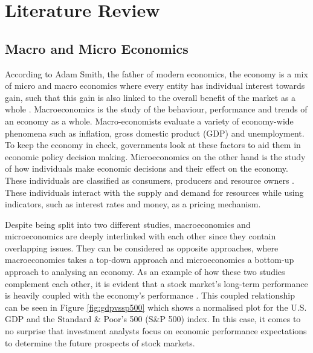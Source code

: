 \documentclass{UoYCSproject}
\begin{document}
\chapter{Literature Review}
\label{cha:literaturereview}

\section{Macro and Micro Economics}
\label{macroandmicro}
According to Adam Smith, the father of modern economics, the economy is a mix of micro and macro economics where every entity has individual interest towards gain, such that this gain is also linked to the overall benefit of the market as a whole \cite{smith1950inquiry}. Macroeconomics is the study of the behaviour, performance and trends of an economy as a whole. Macro-economists evaluate a variety of economy-wide phenomena such as inflation, gross domestic product (GDP) and unemployment. To keep the economy in check, governments look at these factors to aid them in economic policy decision making. Microeconomics on the other hand is the study of how individuals make economic decisions and their effect on the economy. These individuals are classified as consumers, producers and resource owners \cite{dwivedi2002microeconomics}. These individuals interact with the supply and demand for resources while using indicators, such as interest rates and money, as a pricing mechanism. 

Despite being split into two different studies, macroeconomics and microeconomics are deeply interlinked with each other since they contain overlapping issues. They can be considered as opposite approaches, where macroeconomics takes a top-down approach and microeconomics a bottom-up approach to analysing an economy. As an example of how these two studies complement each other, it is evident that a stock market's long-term performance is heavily coupled with the economy's performance \cite{davis2008macroeconomic}. This coupled relationship can be seen in Figure \ref{fig:gdpvssp500} which shows a normalised plot for the U.S. GDP and the Standard \& Poor's 500 (S\&P 500) index. In this case, it comes to no surprise that investment analysts focus on economic performance expectations to determine the future prospects of stock markets.
\end{document}
